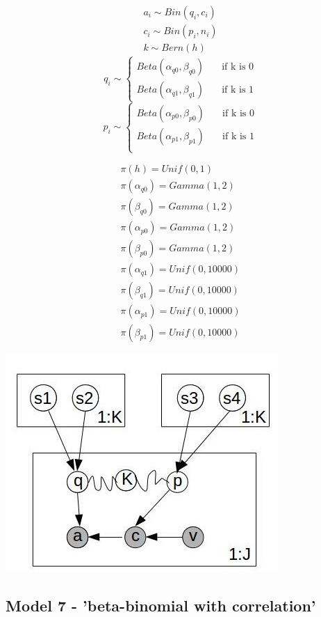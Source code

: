 \documentclass[12pt]{article}
\begin{document}
 \begin{align}
	a_i \sim Bin(q_i,c_i) \\
	c_i \sim Bin(p_i,n_i) \\
	k \sim Bern(h) 
\end{align}
	\[ 
	q_i \sim 
  	\begin{cases}
		Beta(\alpha_{q0},\beta_{q0}) & \quad \text{if k is 0}\\
		Beta(\alpha_{q1},\beta_{q1}) & \quad \text{if k is 1}
	\end{cases}
	\]
	\[
	p_i \sim 
  	\begin{cases}
		Beta(\alpha_{p0},\beta_{p0}) & \quad \text{if k is 0}\\
		Beta(\alpha_{p1},\beta_{p1}) & \quad \text{if k is 1}\\
	\end{cases}
	\]

 \begin{align}
	\pi(h) = Unif(0,1) \\
	\pi(\alpha_{q0}) = Gamma(1,2) \\
	\pi(\beta_{q0}) = Gamma(1,2) \\
	\pi(\alpha_{p0}) = Gamma(1,2) \\
	\pi(\beta_{p0}) = Gamma(1,2) \\
	\pi(\alpha_{q1}) = Unif(0,10000) \\
	\pi(\beta_{q1}) = Unif(0,10000) \\
	\pi(\alpha_{p1}) = Unif(0,10000) \\
	\pi(\beta_{p1}) = Unif(0,10000)
\end{align}

\includegraphics{GraphMod.jpg}

\subsection{Model 7 - 'beta-binomial with correlation'}
\end{document}
